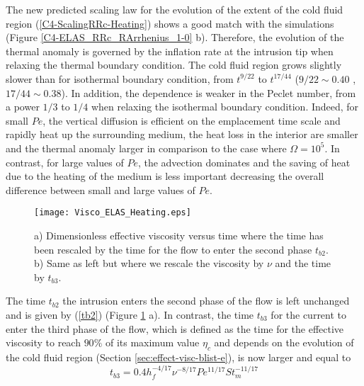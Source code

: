 The new predicted  scaling law for the evolution of  the extent of the
cold  fluid region  (\ref{C4-ScalingRRc-Heating}) shows  a good  match
with   the    simulations   (Figure   \ref{C4-ELAS_RRc_RArrhenius_1-0}
b). Therefore, the evolution of the thermal anomaly is governed by the
inflation rate at the intrusion tip when relaxing the thermal boundary
condition.   The cold  fluid  region grows  slightly  slower than  for
isothermal   boundary  condition,   from  $t^{9/22}$   to  $t^{17/44}$
($9/22\sim 0.40$ , $17/44 \sim 0.38$).  In addition, the dependence is
weaker in the Peclet number, from a power $1/3$ to $1/4$ when relaxing
the  isothermal  boundary  condition.   Indeed, for  small  $Pe$,  the
vertical  diffusion is  efficient on  the emplacement  time scale  and
rapidly heat up the surrounding medium,  the heat loss in the interior
are smaller and  the thermal anomaly larger in comparison  to the case
where  $\Omega= 10^5$.   In contrast,  for large  values of  $Pe$, the
advection dominates and  the saving of heat due to  the heating of the
medium  is less  important decreasing  the overall  difference between
small and large values of $Pe$.

\begin{figure}
  \begin{center}
    \graphicspath{ {/Users/thorey/Documents/These/Projet/Refroidissement/Skin_Model/Figure/Figure_Heating/} }
    \texttt{[image: Visco\_ELAS\_Heating.eps]}
    \caption{a)  Dimensionless effective  viscosity versus  time where
      the time has been rescaled by the time for the flow to enter the
      second phase $t_{b2}$. b) Same as  left but where we rescale the
      viscosity by $\nu$ and the time by $t_{b3}$.}
    \label{C4-Visco_ELAS_Heating}
  \end{center}
\end{figure}

The time $t_{b2}$ the intrusion enters the second phase of the flow is
left    unchanged    and    is   given    by    (\ref{tb2})    (Figure
\ref{C4-Visco_ELAS_Heating} a). In contrast, the time $t_{b3}$ for the
current to enter the third phase of  the flow, which is defined as the
time for the effective viscosity to  reach $90\%$ of its maximum value
$\eta_c$  and  depends on  the  evolution  of  the cold  fluid  region
(Section \ref{sec:effect-visc-blist-e}), is now larger and equal to
\begin{equation}
  t_{b3}=0.4h_f^{-4/17}\nu^{-8/17}Pe^{11/17}St_m^{-11/17}
  \label{C4-tb3}
\end{equation}

